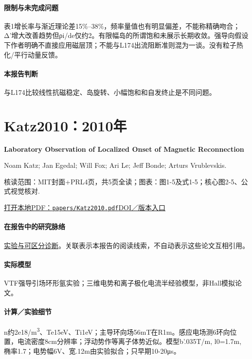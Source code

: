 \documentclass[UTF8,a4paper,11pt,openany,fontset=fandol]{ctexbook}
\begin{document}
\paragraph{限制与未完成问题}表1增长率与渐近理论差15\%–38\%，频率量值也有明显偏差，不能称精确吻合；Δ'增大改善趋势但ρi/de仅约2。有限幅岛的所谓饱和未展示长期收敛。强导向假设下作者明确不直接应用磁层顶；不能与L174出流阻断准则混为一谈。没有粒子热化/平行动量反馈。

\paragraph{本报告判断}与L174比较线性抗磁稳定、岛旋转、小幅饱和和自发终止是不同问题。

\section{Katz2010：2010年}\label{paper:Katz2010}

\textbf{Laboratory Observation of Localized Onset of Magnetic Reconnection}\citep{Katz2010}\

Noam Katz;  Jan Egedal;  Will Fox;  Ari Le;  Jeff Bonde;  Arturs Vrublevskis.

\textsf{核读范围：}MIT封面+PRL4页，共5页全读；\textsf{图表：}图1-5及式1-5；核心图2-5、公式视觉核对.

\href{run:../papers/Katz2010.pdf}{打开本地PDF：\texttt{papers/Katz2010.pdf}}\quad\href{https://doi.org/10.1103/physrevlett.104.255004}{DOI／版本入口}

\paragraph{在报告中的研究脉络}\hyperref[story:diagnostic]{实验与可区分诊断}。关联表示本报告的阅读线索，不自动表示这些论文互相引用。

\paragraph{实际模型}VTF强导引场环形氩实验；三维电势和离子极化电流半经验模型，非Hall模拟论文。

\paragraph{计算／实验细节}n约2e18/m\textsuperscript{3}、Te15eV、Ti1eV；主导环向场56mT在R1m。感应电场测6环向位置，电流密度8cm分辨率；浮动势作等离子体势近似。模型b'.035T/m, l0=1.7m, 椭率1.7；电势幅6V、宽.12m由实验拟合；只早期10-20μs。
\end{document}
